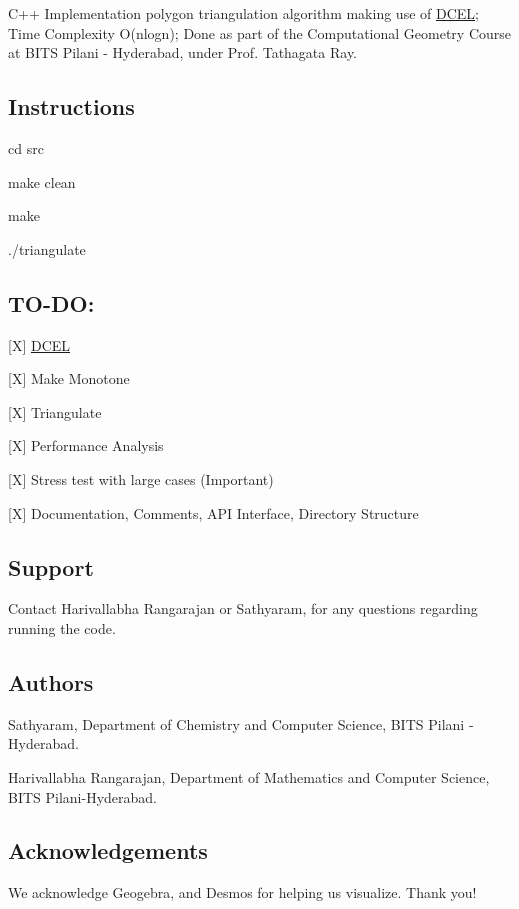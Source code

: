 C++ Implementation polygon triangulation algorithm making use of \hyperlink{structDCEL}{D\+C\+EL}; Time Complexity O(nlogn); Done as part of the Computational Geometry Course at B\+I\+TS Pilani -\/ Hyderabad, under Prof. Tathagata Ray.

\subsection*{Instructions}

{\ttfamily cd src}

{\ttfamily make clean}

{\ttfamily make}

{\ttfamily ./triangulate}

\subsection*{T\+O-\/\+DO\+:}


\begin{DoxyItemize}
\item \mbox{[}X\mbox{]} \hyperlink{structDCEL}{D\+C\+EL}
\item \mbox{[}X\mbox{]} Make Monotone
\item \mbox{[}X\mbox{]} Triangulate
\item \mbox{[}X\mbox{]} Performance Analysis
\item \mbox{[}X\mbox{]} Stress test with large cases (Important)
\item \mbox{[}X\mbox{]} Documentation, Comments, A\+PI Interface, Directory Structure
\end{DoxyItemize}

\subsection*{Support}

Contact Harivallabha Rangarajan or Sathyaram, for any questions regarding running the code.

\subsection*{Authors}


\begin{DoxyItemize}
\item Sathyaram, Department of Chemistry and Computer Science, B\+I\+TS Pilani -\/ Hyderabad.
\item Harivallabha Rangarajan, Department of Mathematics and Computer Science, B\+I\+TS Pilani-\/\+Hyderabad.
\end{DoxyItemize}

\subsection*{Acknowledgements}

We acknowledge Geogebra, and Desmos for helping us visualize. Thank you! 